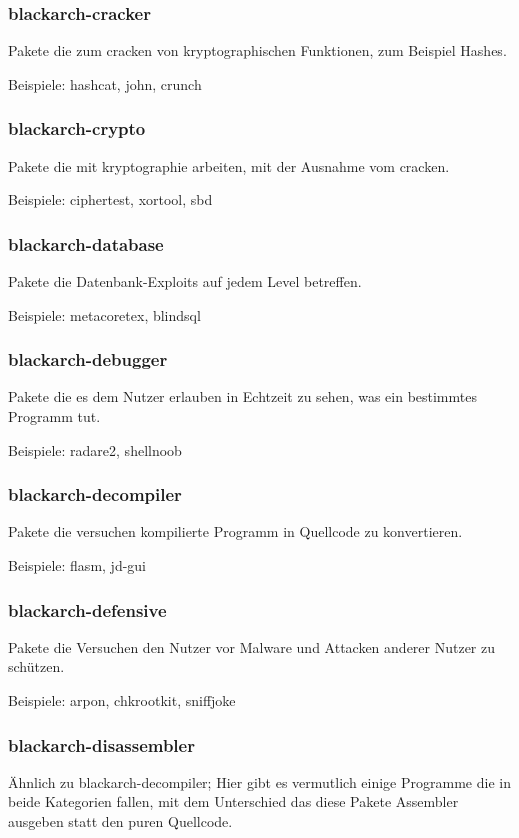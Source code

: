 \documentclass[a4paper, oneside, 11pt]{book}
\begin{document}
\subsubsection{blackarch-cracker}
Pakete die zum cracken von kryptographischen Funktionen, zum Beispiel Hashes.

Beispiele: hashcat, john, crunch

\subsubsection{blackarch-crypto}
Pakete die mit kryptographie arbeiten, mit der Ausnahme vom cracken.

Beispiele: ciphertest, xortool, sbd

\subsubsection{blackarch-database}
Pakete die Datenbank-Exploits auf jedem Level betreffen.

Beispiele: metacoretex, blindsql

\subsubsection{blackarch-debugger}
Pakete die es dem Nutzer erlauben in Echtzeit zu sehen, was ein bestimmtes Programm tut.

Beispiele: radare2, shellnoob

\subsubsection{blackarch-decompiler}
Pakete die versuchen kompilierte Programm in Quellcode zu konvertieren.

Beispiele: flasm, jd-gui

\subsubsection{blackarch-defensive}
Pakete die Versuchen den Nutzer vor Malware und Attacken anderer Nutzer zu schützen.

Beispiele: arpon, chkrootkit, sniffjoke

\subsubsection{blackarch-disassembler}
Ähnlich zu blackarch-decompiler; Hier gibt es vermutlich einige Programme die
in beide Kategorien fallen, mit dem Unterschied das diese Pakete Assembler ausgeben
statt den puren Quellcode.
\end{document}

